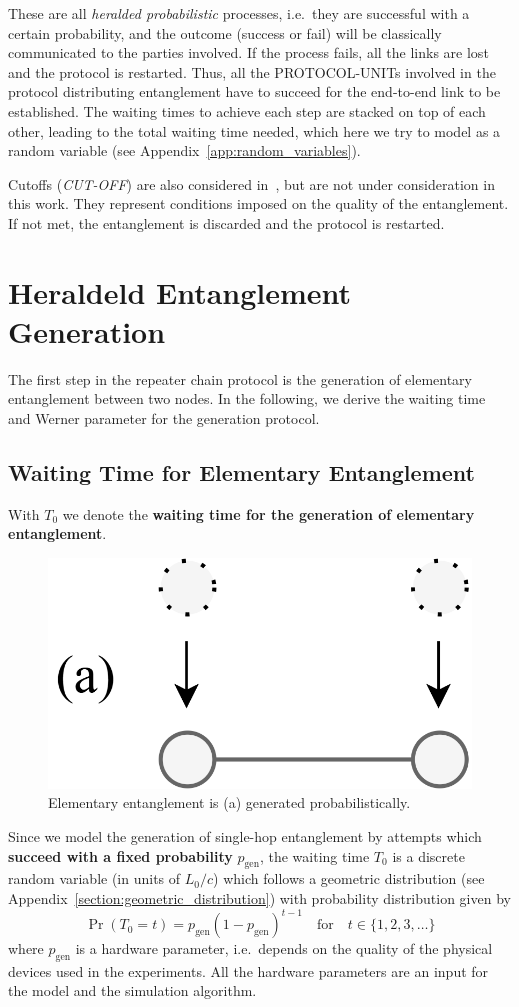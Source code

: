 \documentclass{masterthesis}
\begin{document}
These are all \textit{heralded probabilistic} processes, i.e.\ they are successful with a certain probability, and the outcome (success or fail) will be classically communicated to the parties involved. If the process fails, all the links are lost and the protocol is restarted. Thus, all the PROTOCOL-UNITs involved in the protocol distributing entanglement have to succeed for the end-to-end link to be established. The waiting times to achieve each step are stacked on top of each other, leading to the total waiting time needed, which here we try to model as a random variable (see Appendix~\ref{app:random_variables}).

Cutoffs (\textit{CUT-OFF}) are also considered in~\cite{Li_2021}, but are not under consideration in this work.
They represent conditions imposed on the quality of the entanglement. If not met, the entanglement is discarded and the protocol is restarted.

\section{Heraldeld Entanglement Generation}\label{section:heralded_entanglement_generation}

The first step in the repeater chain protocol is the generation of elementary entanglement between two nodes.
In the following, we derive the waiting time and Werner parameter for the generation protocol.

\subsection{Waiting Time for Elementary Entanglement}

With $T_0$ we denote the \textbf{waiting time for the generation of elementary entanglement}.

\begin{figure}[ht]
    \centering
    \includegraphics[width=0.33\linewidth]{images/gen.png}
    \caption{Elementary entanglement is (a) generated probabilistically.}\label{fig:gen}
\end{figure}

Since we model the generation of single-hop entanglement by attempts which \textbf{succeed with a fixed probability} $p_{\text{gen}}$, the waiting time $T_0$ is a discrete random variable (in units of $L_0 /c$) which follows a geometric distribution (see Appendix~\ref{section:geometric_distribution}) with probability distribution given by 
\begin{equation}
    \Pr(T_0 = t) = p_{\text{gen}} {(1 - p_{\text{gen}})}^{t-1} \quad \text{for} \quad t \in \{1, 2, 3, \ldots \}
\end{equation}
where $p_{\text{gen}}$ is a hardware parameter, i.e.\ depends on the quality of the physical devices used in the experiments.
All the hardware parameters are an input for the model and the simulation algorithm.
\end{document}
